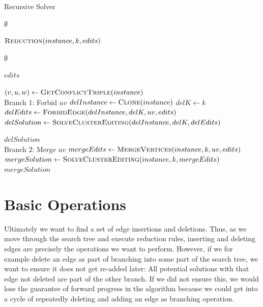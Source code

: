 \documentclass[12pt,oneside,english,parskip=full,headings=small]{scrbook}
\theoremstyle{definition}
\begin{document}
\begin{algorithm}[h]
\caption{Recursive Solver}
\label{alg:solver}
\begin{algorithmic}

		\State \Return $\emptyset$
	\EndIf

	\State $\Call{Reduction}{instance, k, edits}$

		\State \Return $\emptyset$
	\EndIf

		\State \Return $edits$
	\EndIf

	\State $(v, u, w) \gets \Call{GetConflictTriple}{instance}$
	\\
	\LineComment Branch 1: Forbid $uv$
	\State $delInstance \gets \Call{Clone}{instance}$
	\State $delK \gets k$
	\State $delEdits \gets \Call{ForbidEdge}{delInstance, delK, uv, edits}$
	\State $delSolution \gets \Call{SolveClusterEditing}{delInstance, delK, delEdits}$

		\State \Return $delSolution$
	\EndIf
	\\
	\LineComment Branch 2: Merge $uv$
	\State $mergeEdits \gets \Call{MergeVertices}{instance, k, uv, edits}$
	\State $mergeSolution \gets \Call{SolveClusterEditing}{instance, k, mergeEdits}$
	\State \Return $mergeSolution$
\EndFunction

\end{algorithmic}
\end{algorithm}

\section{Basic Operations}

Ultimately we want to find a set of edge insertions and deletions. Thus, as we move through the
search tree and execute reduction rules, inserting and deleting edges are precisely the operations
we want to perform. However, if we for example delete an edge as part of branching into
some part of the search tree, we want to ensure it does not get re-added later: All potential
solutions with that edge not deleted are part of the other branch. If we did not ensure this, we
would lose the guarantee of forward progress in the algorithm because we could get into a cycle of
repeatedly deleting and adding an edge as branching operation.
\end{document}
